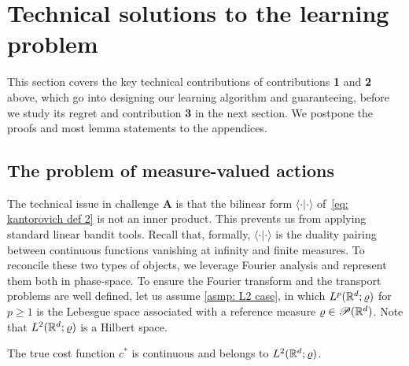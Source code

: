 \section{Technical solutions to the learning problem}\label{sec: Preliminaries}

This section covers the key technical contributions of contributions \textbf{1} and \textbf{2} above, which go into designing our learning algorithm and guaranteeing, before we study its regret and contribution \textbf{3} in the next section. We postpone the proofs and most lemma statements to the appendices.

\subsection{The problem of measure-valued actions}\label{subsec: measure valued actions}

The technical issue in challenge \textbf{A} is that the bilinear form $\langle\cdot\vert\cdot\rangle$ of~\eqref{eq: kantorovich def 2} is not an inner product. This prevents us from applying standard linear bandit tools. Recall that, formally, $\langle\cdot\vert\cdot\rangle$ is the duality pairing between continuous functions vanishing at infinity and finite measures.
To reconcile these two types of objects, we leverage Fourier analysis and represent them both in phase-space. 
To ensure the Fourier transform and the transport problems are well defined, let us assume \cref{asmp: L2 case}, in which $L^p(\mathbb{R}^d;\varrho)$ for $p\ge1$ is the Lebesgue space associated with a reference measure $\varrho\in\mathscr{P}(\mathbb{R}^d)$. Note that $L^2(\mathbb{R}^d;\varrho)$ is a Hilbert space. 

\begin{assumption}\label{asmp: L2 case}
    The true cost function $c^*$ is continuous and belongs to $L^2(\mathbb{R}^d;\varrho)$.
\end{assumption}

